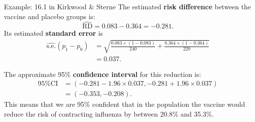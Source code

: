 \documentclass[compress, notes=hide]{beamer}
\newcommand{\hl}[1]{\textbf{#1}}
\begin{document}
\begin{frame}
\begin{block}{Example: 16.1 in Kirkwood \& Sterne}
The estimated \hl{risk difference} between the vaccine and placebo groups is:
\begin{equation*}
\widehat{\mathrm{RD}} = 0.083 - 0.364 = -0.281.
\end{equation*} 
Its estimated \hl{standard error} is
\begin{align*}
\widehat{\mathrm{s.e.}}(p_1-p_0) & = \sqrt{\frac{0.083 \times (1 - 0.083)}{240} + \frac{0.364 \times (1 - 0.364)}{220}} \\
& = 0.037.
\end{align*}
\end{block}
\end{frame}

\begin{frame}
\begin{block}{} 
  The approximate 95\% \hl{confidence interval} for this reduction
  is:
\begin{align*}
\text{95\% CI} & = (-0.281 - 1.96 \times 0.037,-0.281 + 1.96 \times 0.037) \\
& = (-0.353,-0.208).
\end{align*}
This means that we are 95\% confident that in the population the
vaccine would reduce the risk of contracting influenza by between
20.8\% and 35.3\%.
\end{block}
\end{frame}

\end{document}
